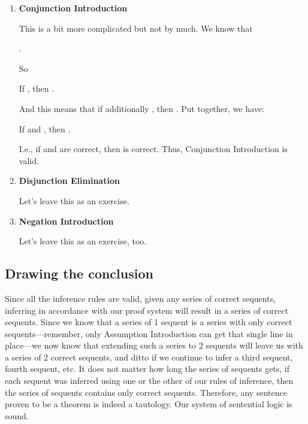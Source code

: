 \begin{enumerate}
\item \textbf{Conjunction Introduction}

This is a bit more complicated but not by much. We know that

\begin{center}
 
 .
   

\end{center}

 So
 
 \begin{center}
  
  If , then .

  \end{center}


   And this means that if additionally , then .  Put together, we have:
 
 \begin{center}

  If  and , then . 

 \end{center}

  I.e., if  and  are correct, then  is correct. Thus, Conjunction Introduction is valid.


\item \textbf{Disjunction Elimination}

 Let's leave this as an exercise.
 

\item \textbf{Negation Introduction}

 Let's leave this as an exercise, too.


\end{enumerate}

\subsection{Drawing the conclusion}

Since all the inference rules are valid, given  any series of  correct 
sequents, inferring in accordance with our proof system will result in a series 
of  correct sequents. Since we know that a series of 1 sequent is a 
series with only correct sequents---remember, only Assumption Introduction can 
get that single line in place---we now know that extending such a series to 2 
sequents will leave us with a series of 2 correct sequents, and ditto if we 
continue to infer a third sequent, fourth sequent, etc. It does not matter how 
long the series of sequents gets, if each sequent was inferred using one or the 
other of our rules of inference, then the series of sequents contains only 
correct sequents. Therefore, any sentence proven to be a theorem is indeed a 
tautology.  Our system of sentential logic is sound.




